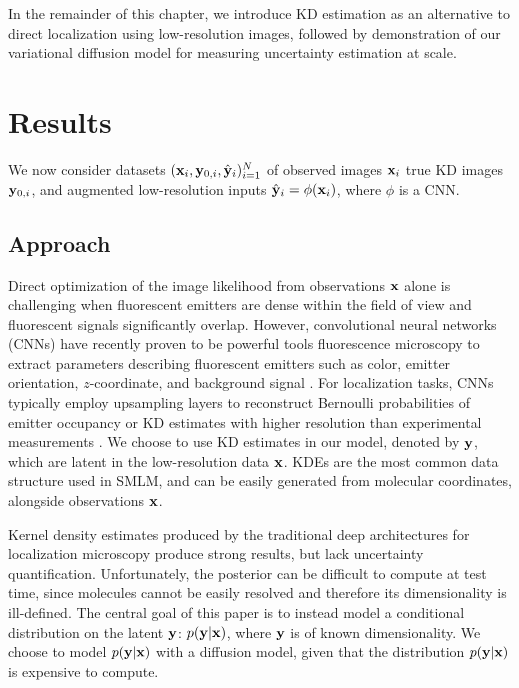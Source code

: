 In the remainder of this chapter, we introduce KD estimation as an alternative to direct localization using low-resolution images, followed by demonstration of our variational diffusion model for measuring uncertainty estimation at scale. 

\section{Results}

We now consider datasets $(\bold{x}_i,\bold{y}_{0,i},\hat{\bold{y}}_{i})_{i=1}^{N}$ of observed images $\bold{x}_i$ true KD images $\bold{y}_{0,i}$, and augmented low-resolution inputs $\hat{\bold{y}}_{i}=\phi(\bold{x}_{i})$, where $\phi$ is a CNN.

\subsection{Approach}

Direct optimization of the image likelihood from observations $\bold{x}$ alone is challenging when fluorescent emitters are dense within the field of view and fluorescent signals significantly overlap. However, convolutional neural networks (CNNs) have recently proven to be powerful tools fluorescence microscopy to extract parameters describing fluorescent emitters such as color, emitter orientation, $z$-coordinate, and background signal \cite{Zhang2018,Kim2019,Zelger2018}. For localization tasks, CNNs typically employ upsampling layers to reconstruct Bernoulli probabilities of emitter occupancy \parencite{Speiser2021} or KD estimates with higher resolution than experimental measurements \parencite{Nehme2020}. We choose to use KD estimates in our model, denoted by $\bold{y}$, which are latent in the low-resolution data $\bold{x}$. KDEs are the most common data structure used in SMLM, and can be easily generated from molecular coordinates, alongside observations $\bold{x}$.

Kernel density estimates produced by the traditional deep architectures for localization microscopy produce strong results, but lack uncertainty quantification. Unfortunately, the posterior can be difficult to compute at test time, since molecules cannot be easily resolved and therefore its dimensionality is ill-defined. The central goal of this paper is to instead model a conditional distribution on the latent $\bold{y}$: $p(\bold{y}\lvert\bold{x})$, where $\bold{y}$ is of known dimensionality. We choose to model $p(\bold{y}\lvert\bold{x})$ with a diffusion model, given that the distribution $p(\bold{y}\lvert\bold{x})$ is expensive to compute.


